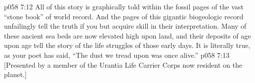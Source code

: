\pc \vs p058 7:12 All of this story is graphically told within the fossil pages of the vast “stone book” of world record. And the pages of this gigantic biogeologic record unfailingly tell the truth if you but acquire skill in their interpretation. Many of these ancient sea beds are now elevated high upon land, and their deposits of age upon age tell the story of the life struggles of those early days. It is literally true, as your poet has said, “The dust we tread upon was once alive.”
\vsetoff
\vs p058 7:13 [Presented by a member of the Urantia Life Carrier Corps now resident on the planet.]

